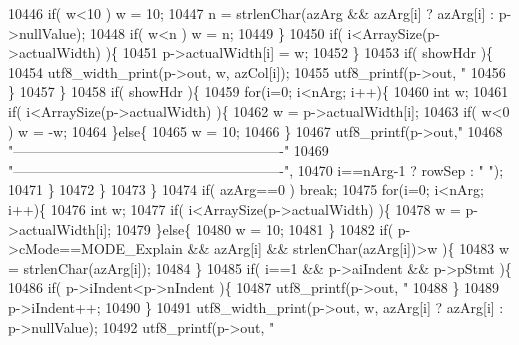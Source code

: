 \begin{DoxyCode}
{{10446             \textcolor{keywordflow}{if}( w<10 ) w = 10;
10447             n = strlenChar(azArg && azArg[i] ? azArg[i] : p->nullValue);
10448             \textcolor{keywordflow}{if}( w<n ) w = n;
10449           \}
10450           \textcolor{keywordflow}{if}( i<ArraySize(p->actualWidth) )\{
10451             p->actualWidth[i] = w;
10452           \}
10453           \textcolor{keywordflow}{if}( showHdr )\{
10454             utf8_width_print(p->out, w, azCol[i]);
10455             utf8_printf(p->out, \textcolor{stringliteral}{"%
10456           \}
10457         \}
10458         \textcolor{keywordflow}{if}( showHdr )\{
10459           \textcolor{keywordflow}{for}(i=0; i<nArg; i++)\{
10460             \textcolor{keywordtype}{int} w;
10461             \textcolor{keywordflow}{if}( i<ArraySize(p->actualWidth) )\{
10462                w = p->actualWidth[i];
10463                \textcolor{keywordflow}{if}( w<0 ) w = -w;
10464             \}\textcolor{keywordflow}{else}\{
10465                w = 10;
10466             \}
10467             utf8_printf(p->out,\textcolor{stringliteral}{"%
10468                    \textcolor{stringliteral}{"----------------------------------------------------------"}
10469                    \textcolor{stringliteral}{"----------------------------------------------------------"},
10470                     i==nArg-1 ? rowSep : \textcolor{stringliteral}{"  "});
10471           \}
10472         \}
10473       \}
10474       \textcolor{keywordflow}{if}( azArg==0 ) \textcolor{keywordflow}{break};
10475       \textcolor{keywordflow}{for}(i=0; i<nArg; i++)\{
10476         \textcolor{keywordtype}{int} w;
10477         \textcolor{keywordflow}{if}( i<ArraySize(p->actualWidth) )\{
10478            w = p->actualWidth[i];
10479         \}\textcolor{keywordflow}{else}\{
10480            w = 10;
10481         \}
10482         \textcolor{keywordflow}{if}( p->cMode==MODE_Explain && azArg[i] && strlenChar(azArg[i])>w )\{
10483           w = strlenChar(azArg[i]);
10484         \}
10485         \textcolor{keywordflow}{if}( i==1 && p->aiIndent && p->pStmt )\{
10486           \textcolor{keywordflow}{if}( p->iIndent<p->nIndent )\{
10487             utf8_printf(p->out, \textcolor{stringliteral}{"%
10488           \}
10489           p->iIndent++;
10490         \}
10491         utf8_width_print(p->out, w, azArg[i] ? azArg[i] : p->nullValue);
10492         utf8_printf(p->out, \textcolor{stringliteral}{"%
}}}}}}
\end{DoxyCode}
